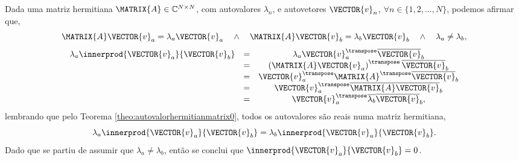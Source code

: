 \begin{myproofT}\label{proof:theo:autovetorortogonalhermitian0}
Dada uma matriz hermitiana $\MATRIX{A} \in \mathbb{C}^{N \times N}$, com  autovalores $\lambda_n$,
e autovetores $\VECTOR{v}_n$, $\forall n \in \{1, 2, ..., N\}$, podemos afirmar que,
\begin{equation}
\MATRIX{A} \VECTOR{v}_a= \lambda_a \VECTOR{v}_a 
\quad \wedge \quad 
\MATRIX{A} \VECTOR{v}_b= \lambda_b \VECTOR{v}_b
\quad \wedge \quad 
\lambda_a \neq \lambda_b, 
\end{equation}
\begin{equation}
\begin{matrix}
\lambda_a \innerprod{\VECTOR{v}_a}{\VECTOR{v}_b} & = & \lambda_a \VECTOR{v}_a^{\transpose} \overline{\VECTOR{v}}_b\\
~ & = & \left( \MATRIX{A}\VECTOR{v}_a\right)^{\transpose} \overline{\VECTOR{v}}_b \\
~ & = & \VECTOR{v}_a^{\transpose} \MATRIX{A}^{\transpose} \overline{\VECTOR{v}}_b \\
~ & = & \VECTOR{v}_a^{\transpose} \overline{\MATRIX{A}} \overline{\VECTOR{v}}_b \\
~ & = & \VECTOR{v}_a^{\transpose} \overline{\lambda_b} \overline{\VECTOR{v}}_b,
\end{matrix}
\end{equation}
lembrando que pelo Teorema \ref{theo:autovalorhermitianmatrix0}, todos os autovalores são reais 
numa matriz hermitiana,
\begin{equation}
\lambda_a \innerprod{\VECTOR{v}_a}{\VECTOR{v}_b} = \lambda_b \innerprod{\VECTOR{v}_a}{\VECTOR{v}_b}.
\end{equation}
Dado que se partiu de assumir que $\lambda_a \neq \lambda_b$, 
então se conclui que $\innerprod{\VECTOR{v}_a}{\VECTOR{v}_b}=0$.
\end{myproofT}


